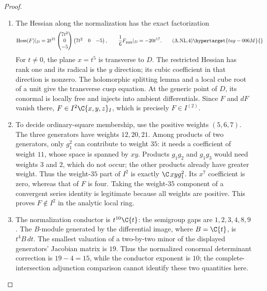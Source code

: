 \begin{proof}
\begin{enumerate}[label={$\langle1\rangle$\arabic*.},leftmargin=*]
\item The Hessian along the normalization has the exact factorization
\[
 \operatorname{Hess}(F)|_D
 =2t^{21}
 \begin{pmatrix}7t^2\\0\\-5\end{pmatrix}
 \begin{pmatrix}7t^2&0&-5\end{pmatrix},
 \qquad \frac{1}{6}F_{yyy}|_D=-20t^{17}.                       \tag{A.NL.4}\hypertarget{tag-006M}{}\label{cdp:eq:A.NL.4}
\]
For $t\ne0$, the plane $x=t^5$ is transverse to $D$.
The restricted Hessian has rank one and its radical is the
$y$ direction; its cubic coefficient in that direction is nonzero.
The holomorphic splitting lemma and a local cube root of a unit
give the transverse cusp equation. At the generic point of $D$,
its conormal is locally free and injects into ambient differentials.
Since $F$ and $dF$ vanish there, $F\in I^2\C\{x,y,z\}_I$,
which is precisely $F\in I^{(2)}$.

\item To decide ordinary-square membership, use the positive weights
$(5,6,7)$. The three generators have weights $12,20,21$.
Among products of two generators, only $g_1^2$ can contribute
to weight $35$: it needs a coefficient of weight $11$, whose
space is spanned by $xy$. Products $g_1g_2$ and $g_1g_3$ would
need weights $3$ and $2$, which do not occur; the other products
already have greater weight. Thus the weight-$35$ part of $I^2$
is exactly $\C\,xyg_1^2$. Its $x^7$ coefficient is zero, whereas
that of $F$ is four. Taking the weight-$35$ component of a
convergent series identity is legitimate because all weights are
positive. This proves $F\notin I^2$ in the analytic local ring.

\item The normalization conductor
is $t^{10}\C\{t\}$: the semigroup gaps are $1,2,3,4,8,9$.
The $B$-module generated by the differential image, where $B=\C\{t\}$, is $t^4B\,dt$.
The smallest valuation of a two-by-two minor of the displayed
generators' Jacobian matrix is $19$. Thus the normalized conormal
determinant correction is $19-4=15$, while the conductor exponent
is $10$; the complete-intersection adjunction comparison cannot
identify these two quantities here.


\end{enumerate}
\end{proof}
